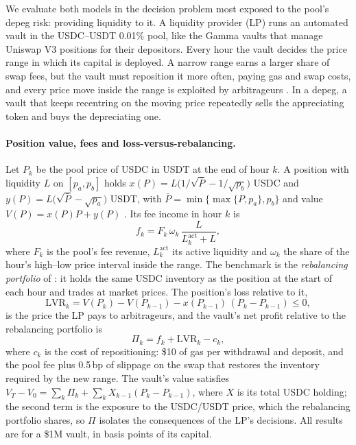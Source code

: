 We evaluate both models in the decision problem most exposed to the pool's depeg risk: providing liquidity
to it. A liquidity provider (LP) runs an automated vault in the USDC--USDT 0.01\% pool, like the Gamma vaults
that manage Uniswap V3 positions for their depositors. Every hour the vault decides the price range in which
its capital is deployed. A narrow range earns a larger share of swap fees, but the vault must reposition it
more often, paying gas and swap costs, and every price move inside the range is exploited by arbitrageurs
\citep{Milionis2022}. In a depeg, a vault that keeps recentring on the moving price repeatedly sells the
appreciating token and buys the depreciating one.

\paragraph{Position value, fees and loss-versus-rebalancing.} Let $P_k$ be the pool price of USDC in USDT at
the end of hour $k$. A position with liquidity $L$ on $[p_a,p_b]$ holds
$x(P)=L\big(1/\sqrt{\bar P}-1/\sqrt{p_b}\big)$ USDC and $y(P)=L\big(\sqrt{\bar P}-\sqrt{p_a}\big)$ USDT, with
$\bar P=\min\{\max\{P,p_a\},p_b\}$ and value $V(P)=x(P)P+y(P)$ \citep{uniswap_whitepaper}. Its fee income in
hour $k$ is
\begin{equation}
f_k=F_k\,\omega_k\,\frac{L}{L^{\mathrm{act}}_k+L},
\end{equation}
where $F_k$ is the pool's fee revenue, $L^{\mathrm{act}}_k$ its active liquidity and $\omega_k$ the share of
the hour's high--low price interval inside the range. The benchmark is the \emph{rebalancing portfolio} of
\citet{Milionis2022}: it holds the same USDC inventory as the position at the start of each hour and trades
at market prices. The position's loss relative to it,
\begin{equation}
\mathrm{LVR}_k=V(P_k)-V(P_{k-1})-x(P_{k-1})\,(P_k-P_{k-1})\le 0,
\end{equation}
is the price the LP pays to arbitrageurs, and the vault's net profit relative to the rebalancing portfolio is
\begin{equation}
\Pi_k=f_k+\mathrm{LVR}_k-c_k,
\end{equation}
where $c_k$ is the cost of repositioning: \$10 of gas per withdrawal and deposit, and the pool fee plus
0.5\,bp of slippage on the swap that restores the inventory required by the new range. The vault's value
satisfies $V_T-V_0=\sum_k\Pi_k+\sum_k X_{k-1}(P_k-P_{k-1})$, where $X$ is its total USDC holding; the second
term is the exposure to the USDC/USDT price, which the rebalancing portfolio shares, so $\Pi$ isolates the
consequences of the LP's decisions. All results are for a \$1M vault, in basis points of its capital.

